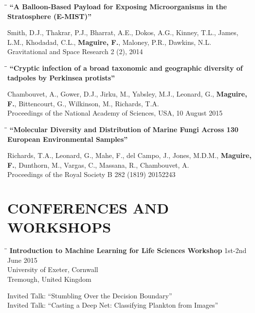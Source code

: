 \documentclass{res}
\begin{document}
\begin{resume}
\vspace{-0.2in}
\begin{tabbing}
   \hspace{2.3in}\= \hspace{2.6in}\= \kill
   {\bf ``A Balloon-Based Payload for Exposing Microorganisms in the Stratosphere (E-MIST)''}
   \end{tabbing}\vspace{-20pt}
   Smith, D.J., Thakrar, P.J., Bharrat, A.E., Dokos, A.G., Kinney, T.L., James, L.M., Khodadad, C.L., \textbf{Maguire, F.}, Maloney, P.R., Dawkins, N.L.\\
Gravitational and Space Research 2 (2), 2014\\

\vspace{-0.2in}
\begin{tabbing}
   \hspace{2.3in}\= \hspace{2.6in}\= \kill
   {\bf ``Cryptic infection of a broad taxonomic and geographic diversity of tadpoles by Perkinsea protists''}
   \end{tabbing}\vspace{-20pt}
   Chambouvet, A., Gower, D.J., Jirku, M., Yabsley, M.J., Leonard, G., \textbf{Maguire, F.}, Bittencourt, G., Wilkinson, M., Richards, T.A.\\
Proceedings of the National Academy of Sciences, USA, 10 August 2015

\vspace{-0.1in}
\begin{tabbing}
   \hspace{2.3in}\= \hspace{2.6in}\= \kill
   {\bf ``Molecular Diversity and Distribution of Marine Fungi Across 130 European Environmental Samples''}
   \end{tabbing}\vspace{-20pt}
   Richards, T.A., Leonard, G., Mahe, F., del Campo, J., Jones, M.D.M., \textbf{Maguire, F.}, Dunthorn, M., Vargas, C., Massana, R., Chambouvet, A.\\
Proceedings of the Royal Society B 282 (1819) 20152243

\section{CONFERENCES AND WORKSHOPS}
  \vspace{-0.05in}


\begin{tabbing}
\hspace{2in}\= \hspace{2.6in}\= \kill
{\bf Introduction to Machine Learning for Life Sciences Workshop} \> \> 1st-2nd June 2015\\
\> \>University of Exeter, Cornwall \\
\> \> Tremough, United Kingdom\\
\end{tabbing}\vspace{-40pt}
Invited Talk: ``Stumbling Over the Decision Boundary''\\
Invited Talk: ``Casting a Deep Net: Classifying Plankton from Images''



\end{resume}
\end{document}

